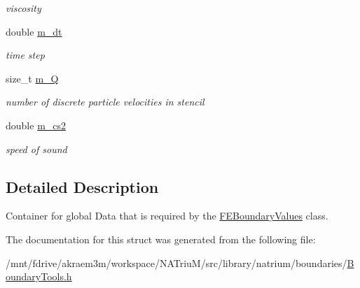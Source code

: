 \begin{DoxyCompactItemize}
\begin{DoxyCompactList}\small\item\em viscosity \item\end{DoxyCompactList}\item 
\hypertarget{structnatrium_1_1GlobalBoundaryData_a1439fef0250e57ec53dd02c833339167}{
double \hyperlink{structnatrium_1_1GlobalBoundaryData_a1439fef0250e57ec53dd02c833339167}{m\_\-dt}}
\label{structnatrium_1_1GlobalBoundaryData_a1439fef0250e57ec53dd02c833339167}

\begin{DoxyCompactList}\small\item\em time step \item\end{DoxyCompactList}\item 
\hypertarget{structnatrium_1_1GlobalBoundaryData_a2b85d0c2f50a9d9f7ab10216ab222a63}{
size\_\-t \hyperlink{structnatrium_1_1GlobalBoundaryData_a2b85d0c2f50a9d9f7ab10216ab222a63}{m\_\-Q}}
\label{structnatrium_1_1GlobalBoundaryData_a2b85d0c2f50a9d9f7ab10216ab222a63}

\begin{DoxyCompactList}\small\item\em number of discrete particle velocities in stencil \item\end{DoxyCompactList}\item 
\hypertarget{structnatrium_1_1GlobalBoundaryData_a1a3b7c46e08d7afd4b48456310c8aa9d}{
double \hyperlink{structnatrium_1_1GlobalBoundaryData_a1a3b7c46e08d7afd4b48456310c8aa9d}{m\_\-cs2}}
\label{structnatrium_1_1GlobalBoundaryData_a1a3b7c46e08d7afd4b48456310c8aa9d}

\begin{DoxyCompactList}\small\item\em speed of sound \item\end{DoxyCompactList}\end{DoxyCompactItemize}


\subsection{Detailed Description}
Container for global Data that is required by the \hyperlink{classnatrium_1_1FEBoundaryValues}{FEBoundaryValues} class. 

The documentation for this struct was generated from the following file:\begin{DoxyCompactItemize}
\item 
/mnt/fdrive/akraem3m/workspace/NATriuM/src/library/natrium/boundaries/\hyperlink{BoundaryTools_8h}{BoundaryTools.h}\end{DoxyCompactItemize}
